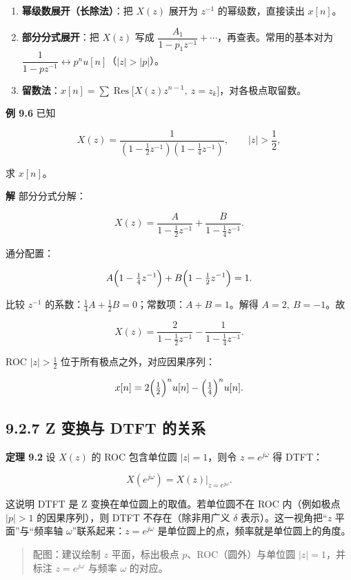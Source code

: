 \begin{enumerate}
\def\labelenumi{\arabic{enumi}.}
\tightlist
\item
  \textbf{幂级数展开（长除法）}：把 \(X(z)\) 展开为 \(z^{-1}\)
  的幂级数，直接读出 \(x[n]\)。
\item
  \textbf{部分分式展开}：把 \(X(z)\) 写成
  \(\dfrac{A_1}{1-p_1 z^{-1}}+\cdots\)，再查表。常用的基本对为
  \(\dfrac{1}{1-p z^{-1}}\leftrightarrow p^n u[n]\)（\(|z|>|p|\)）。
\item
  \textbf{留数法}：\(x[n]=\sum \operatorname{Res}\bigl[X(z)z^{n-1},\ z=z_k\bigr]\)，对各极点取留数。
\end{enumerate}

\textbf{例 9.6} 已知

\[
X(z)=\frac{1}{(1-\tfrac{1}{2}z^{-1})(1-\tfrac{1}{4}z^{-1})},\qquad |z|>\frac{1}{2},
\]

求 \(x[n]\)。

\textbf{解} 部分分式分解：

\[
X(z)=\frac{A}{1-\tfrac12 z^{-1}}+\frac{B}{1-\tfrac14 z^{-1}} .
\]

通分配置：

\[
A\Bigl(1-\tfrac14 z^{-1}\Bigr)+B\Bigl(1-\tfrac12 z^{-1}\Bigr)=1 .
\]

比较 \(z^{-1}\)
的系数：\(\tfrac14 A+\tfrac12 B = 0\)；常数项：\(A+B=1\)。解得
\(A=2,\ B=-1\)。故

\[
X(z)=\frac{2}{1-\tfrac12 z^{-1}}-\frac{1}{1-\tfrac14 z^{-1}} .
\]

ROC \(|z|>\tfrac12\) 位于所有极点之外，对应因果序列：

\[
x[n]=2\Bigl(\tfrac12\Bigr)^{n}u[n]-\Bigl(\tfrac14\Bigr)^{n}u[n] .
\]

\subsection{9.2.7 Z 变换与 DTFT
的关系}\label{z-ux53d8ux6362ux4e0e-dtft-ux7684ux5173ux7cfb}

\textbf{定理 9.2} 设 \(X(z)\) 的 ROC 包含单位圆 \(|z|=1\)，则令
\(z=e^{j\omega}\) 得 DTFT：

\[
X(e^{j\omega}) = X(z)\Big|_{z=e^{j\omega}} .
\]

这说明 DTFT 是 Z 变换在单位圆上的取值。若单位圆不在 ROC 内（例如极点
\(|p|>1\) 的因果序列），则 DTFT 不存在（除非用广义 \(\delta\)
表示）。这一视角把``\(z\) 平面''与``频率轴
\(\omega\)''联系起来：\(z=e^{j\omega}\)
是单位圆上的点，频率就是单位圆上的角度。

\begin{quote}
配图：建议绘制 \(z\) 平面，标出极点 \(p\)、ROC（圆外）与单位圆
\(|z|=1\)，并标注 \(z=e^{j\omega}\) 与频率 \(\omega\) 的对应。
\end{quote}

